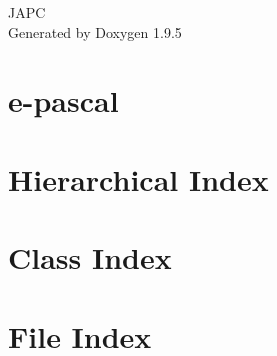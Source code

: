 \documentclass[twoside]{book}
\newcommand{\+}{\discretionary{\mbox{\scriptsize$\hookleftarrow$}}{}{}}
\newcommand{\clearemptydoublepage}{%
    \newpage{\pagestyle{empty}\cleardoublepage}%
  }
\begin{document}
  \raggedbottom
    \hypersetup{pageanchor=false,
                bookmarksnumbered=true,
                pdfencoding=unicode
               }
  \begin{titlepage}
  \vspace*{7cm}
  \begin{center}%
  {\Large JAPC}\\
  \vspace*{1cm}
  {\large Generated by Doxygen 1.9.5}\\
  \end{center}
  \end{titlepage}
  \clearemptydoublepage
  \tableofcontents
  \clearemptydoublepage
  \hypersetup{pageanchor=true}
\chapter{e-\/pascal}
\label{md_README}

\chapter{Hierarchical Index}

\chapter{Class Index}

\chapter{File Index}

\end{document}
